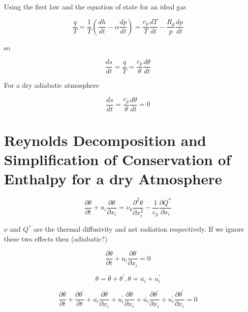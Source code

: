 Using the first law and the equation of state for an ideal gas

\begin{equation}
\frac{q}{T} = \frac{1}{T} \left(\frac{dh}{dt} - \alpha \frac{dp}{dt}\right) =  \frac{c_{p}}{T} \frac{dT}{dt} - \frac{R_{d}}{p} \frac{dp}{dt}
\end{equation}

so

\begin{equation}
\frac{ds}{dt} = \frac{q}{T} =  \frac{c_{p}}{\theta}\frac{d\theta}{dt}
\end{equation}

For a dry adiabatic atmosphere

\begin{equation}
\frac{ds}{dt} =  \frac{c_{p}}{\theta}\frac{d\theta}{dt} = 0
\end{equation}

\section{Reynolds Decomposition and Simplification of Conservation of Enthalpy for a dry Atmosphere}

\begin{equation}
\frac{\partial \theta}{\partial t} + u_{i}\frac{\partial \theta}{\partial x_{i}} = \nu_{\theta} \frac{\partial^{2}\theta}{\partial x_{i}^{2}} - \frac{1}{c_{p}}\frac{\partial Q^{*}}{\partial x_{i}}
\end{equation}

$\nu$ and $Q^{*}$ are the thermal diffusivity and net radiation respectively.  If we ignore these two effects then (adiabatic?)

\begin{equation}
\frac{\partial \theta}{\partial t} + u_{i}\frac{\partial \theta}{\partial x_{i}} = 0
\end{equation}

\begin{equation}
\theta = \overline{\theta} + \theta^{'}, \theta = \overline{u_{i}} + u_{i}^{'} 
\end{equation}

\begin{equation}
\frac{\partial \overline{\theta}}{\partial t} + \frac{\partial \theta^{'}}{\partial t} + \overline{u_{i}}\frac{\partial \overline{\theta}}{\partial x_{i}} + u_{i}^{'}\frac{\partial \overline{\theta}}{\partial x_{i}} + \overline{u_{i}}\frac{\partial \theta^{'}}{\partial x_{i}} + u_{i}^{'}\frac{\partial \theta^{'}}{\partial x_{i}} = 0
\end{equation}

